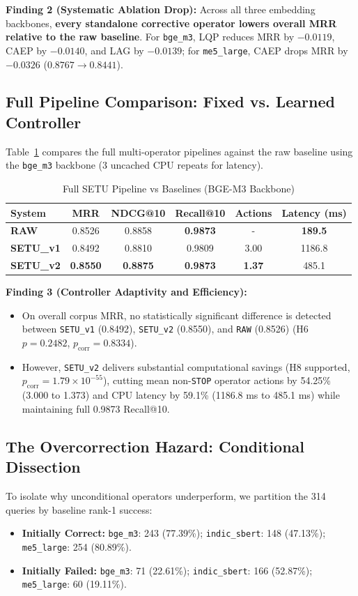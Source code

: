 \documentclass[conference]{IEEEtran}
\begin{document}
\textbf{Finding 2 (Systematic Ablation Drop):} Across all three embedding backbones, \textbf{every standalone corrective operator lowers overall MRR relative to the raw baseline}. For \texttt{bge\_m3}, LQP reduces MRR by $-0.0119$, CAEP by $-0.0140$, and LAG by $-0.0139$; for \texttt{me5\_large}, CAEP drops MRR by $-0.0326$ ($0.8767 \to 0.8441$).

\subsection{Full Pipeline Comparison: Fixed vs. Learned Controller}
Table~\ref{tab:full_setu} compares the full multi-operator pipelines against the raw baseline using the \texttt{bge\_m3} backbone (3 uncached CPU repeats for latency).

\begin{table}[t]
\caption{Full SETU Pipeline vs Baselines (BGE-M3 Backbone)}
\label{tab:full_setu}
\centering
\begin{tabular}{lccccc}
\toprule
System & MRR & NDCG@10 & Recall@10 & Actions & Latency (ms) \\
\midrule
\textbf{RAW} & 0.8526 & 0.8858 & \textbf{0.9873} & - & \textbf{189.5} \\
\textbf{SETU\_v1} & 0.8492 & 0.8810 & 0.9809 & 3.00 & 1186.8 \\
\textbf{SETU\_v2} & \textbf{0.8550} & \textbf{0.8875} & \textbf{0.9873} & \textbf{1.37} & 485.1 \\
\bottomrule
\end{tabular}
\end{table}

\textbf{Finding 3 (Controller Adaptivity and Efficiency):}
\begin{itemize}
    \item On overall corpus MRR, no statistically significant difference is detected between \texttt{SETU\_v1} (0.8492), \texttt{SETU\_v2} (0.8550), and \texttt{RAW} (0.8526) (H6 $p = 0.2482$, $p_{\text{corr}} = 0.8334$).
    \item However, \texttt{SETU\_v2} delivers substantial computational savings (H8 supported, $p_{\text{corr}} = 1.79 \times 10^{-55}$), cutting mean non-\texttt{STOP} operator actions by 54.25\% (3.000 to 1.373) and CPU latency by 59.1\% (1186.8 ms to 485.1 ms) while maintaining full 0.9873 Recall@10.
\end{itemize}

\subsection{The Overcorrection Hazard: Conditional Dissection}
To isolate why unconditional operators underperform, we partition the 314 queries by baseline rank-1 success:
\begin{itemize}
    \item \textbf{Initially Correct:} \texttt{bge\_m3}: 243 (77.39\%); \texttt{indic\_sbert}: 148 (47.13\%); \texttt{me5\_large}: 254 (80.89\%).
    \item \textbf{Initially Failed:} \texttt{bge\_m3}: 71 (22.61\%); \texttt{indic\_sbert}: 166 (52.87\%); \texttt{me5\_large}: 60 (19.11\%).
\end{itemize}
\end{document}
